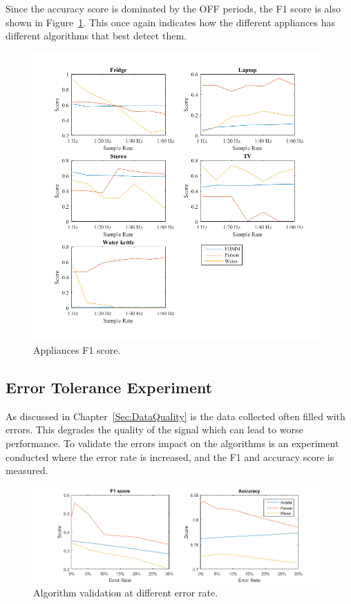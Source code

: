 Since the accuracy score is dominated by the OFF periods, the F1 score is also shown in Figure~\ref{fig:AppF1}. This once again indicates how the different appliances has different algorithms that best detect them.  


\begin{figure}[H]
\centering
\includegraphics[width=1\textwidth]{billeder/App-F1Score.png}
\caption{Appliances F1 score.}
\label{fig:AppF1}
\end{figure}

\newpage

\subsection{Error Tolerance Experiment}
\label{Sec:ETE}
As discussed in Chapter~\ref{Sec:DataQuality} is the data collected often filled with errors. This degrades the quality of the signal which can lead to worse performance. To validate the errors impact on the algorithms is an experiment conducted where the error rate is increased, and the F1 and accuracy score is measured. 

\begin{figure}[H]
\centering
\includegraphics[width=1\textwidth]{billeder/AlgoErrorRate.png}
\caption{Algorithm validation at different error rate.}
\label{fig:ErrorEx}
\end{figure}

